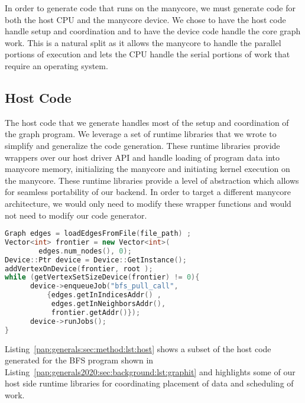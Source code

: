 In order to generate code that runs on the manycore, we must generate code for both the host CPU and the manycore device.
We chose to have the host code handle setup and coordination and to have the device code handle the core graph work.
This is a natural split as it allows the manycore to handle the parallel portions of execution and lets the CPU handle the serial portions of work that require an operating system.

\subsection{Host Code} 

The host code that we generate handles most of the setup and coordination of the graph program. 
We leverage a set of runtime libraries that we wrote to simplify and generalize the code generation. 
These runtime libraries provide wrappers over our host driver API and handle loading of program data into manycore memory, initializing the manycore and initiating kernel execution on the manycore. 
These runtime libraries provide a level of abstraction which allows for seamless portability of our backend. 
In order to target a different manycore architecture, we would only need to modify these wrapper functions and would not need to modify our code generator.
\newline
{}
\begin{lstlisting}[language=C++, breaklines=true, 
                   caption=Generated manycore host code for the Breadth-First Search (BFS) program shown in Listing~\ref{pap:generals2020:sec:background:lst:graphit}.,
                   label=pap:generals:sec:method:lst:host]
Graph edges = loadEdgesFromFile(file_path) ;
Vector<int> frontier = new Vector<int>(
        edges.num_nodes(), 0);
Device::Ptr device = Device::GetInstance();
addVertexOnDevice(frontier, root );
while (getVertexSetSizeDevice(frontier) != 0){
      device->enqueueJob("bfs_pull_call",
          {edges.getInIndicesAddr() , 
           edges.getInNeighborsAddr(), 
           frontier.getAddr()}); 
      device->runJobs();
}
\end{lstlisting}
Listing~\ref{pap:generals:sec:method:lst:host} shows a subset of the host code generated for the BFS program shown in Listing~\ref{pap:generals2020:sec:background:lst:graphit} and highlights some of our host side runtime libraries for coordinating placement of data and scheduling of work.

